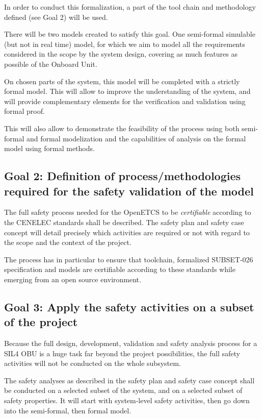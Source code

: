 \documentclass{template/openetcs_article}
\begin{document}
In order to conduct this formalization, a part of the tool chain and methodology defined (see Goal 2) 
will be used.

There will be two models created to satisfy this goal. One semi-formal simulable (but not in real time)
model, for which we aim to model all the requirements considered in the scope by the system design, covering as
much features as possible of the Onboard Unit.

On chosen parts of the system, this model will be completed with a strictly formal model. This will allow to improve
the understanding of the system, and will provide complementary elements for the verification and validation using formal proof. 

This will also allow to demonstrate the feasibility of the process using both semi-formal and formal modelization 
and the capabilities of analysis on the formal model using formal methods. 

\subsection{Goal 2: Definition of process/methodologies required for the safety validation
of the model}

The full safety process needed for the OpenETCS to be \emph{certifiable} according to the CENELEC standards
shall be described. The safety plan and safety case concept will detail precisely which activities 
are required or not with regard to the scope and the context of the project.

The process has in particular to ensure that toolchain, formalized SUBSET-026 specification and models are certifiable 
according to these standards while emerging from an open source environment. 

\subsection{Goal 3: Apply the safety activities on a subset of the project}
Because the full design, development, validation and safety analysis process for a SIL4 OBU
is a huge task far beyond the project possibilities, the full safety activities will not be conducted
on the whole subsystem. 

The safety analyses as described in the safety plan and safety case concept shall be conducted on a selected 
subset of the system, and on a selected subset of safety properties. It will start with system-level safety 
activities, then go down into the semi-formal, then formal model.
\end{document}
